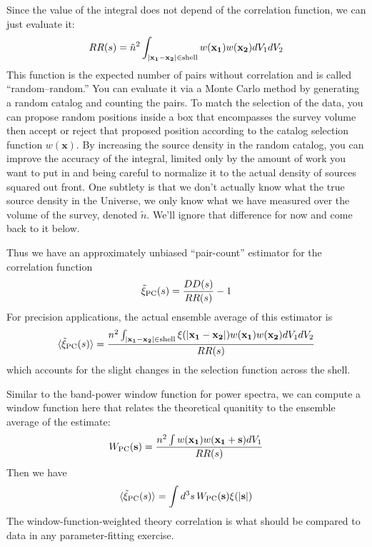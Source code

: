   Since the value of the integral does not depend of the correlation function, we can just evaluate it:
  \begin{equation}
    RR(s) = \tilde n^2 \int_{|\mathbf{x_1 - x_2}| \in \mbox{\scriptsize shell}}  w(\mathbf{x_1}) w(\mathbf{x_2}) {dV_1}{dV_2} 
  \end{equation}
  This function is the expected number of pairs without correlation and is called ``random--random.''  You can evaluate it via a Monte Carlo method by generating a random catalog and counting the pairs.  To match the selection of the data, you can propose random positions inside a box that encompasses the survey volume then accept or reject that proposed position according to the catalog selection function $w(\mathbf x)$.  By increasing the source density in the random catalog, you can improve the accuracy of the integral, limited only by the amount of work you want to put in and being careful to normalize it to the actual density of sources squared out front.  One subtlety is that we don't actually know what the true source density in the Universe, we only know what we have measured over the volume of the survey, denoted $\tilde n$.  We'll ignore that difference for now and come back to it below.

Thus we have an approximately unbiased ``pair-count'' estimator for the correlation function
\begin{equation} \tilde \xi_{\rm PC}(s)  = \frac{DD(s)}{RR(s)} - 1
\end{equation}
For precision applications, the actual ensemble average of this estimator is
\begin{equation}
  \langle  \tilde \xi_{\rm PC}(s) \rangle = \frac{n^2 \int_{|\mathbf{x_1 - x_2}| \in \mbox{\scriptsize shell}}   \xi(|\mathbf{x_1 - x_2}|)   w(\mathbf{x_1}) w(\mathbf{x_2}) {dV_1}{dV_2}  }{RR(s)}
\end{equation}
which accounts for the slight changes in the selection function across the shell. 

Similar to the band-power window function for power spectra, we can compute a window function here that relates the theoretical quanitity to the ensemble average of the estimate:
\begin{equation}
  W_{\rm PC}(\mathbf s)  = \frac{n^2 \int   w(\mathbf{x_1}) w(\mathbf{x_1 + s}) {dV_1}  }{RR(s)}
\end{equation}
Then we have
\begin{equation}
\langle  \tilde \xi_{\rm PC}(s) \rangle = \int d^3s\, W_{\rm PC}(\mathbf s)  \xi(|\mathbf{s}|)  
\end{equation}
The window-function-weighted theory correlation is what should be compared to data in any parameter-fitting exercise.


